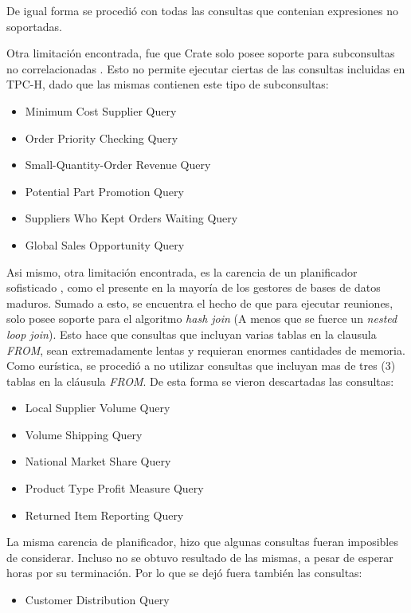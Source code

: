 \documentclass[11pt, twocolumns]{article}
\begin{document}
\begin{multicols}{2}
\begin{verbatim}
\end{verbatim}
De igual forma se procedió con todas las consultas que contenian expresiones no soportadas.
\par
Otra limitación encontrada, fue que Crate solo posee soporte para subconsultas no correlacionadas \cite{crate}. Esto no permite ejecutar ciertas de las consultas incluidas en TPC-H, dado que las mismas contienen este tipo de subconsultas:
\begin{itemize}
  \item [2.] Minimum Cost Supplier Query
  \item [4.] Order Priority Checking Query
  \item [17.] Small-Quantity-Order Revenue Query
  \item [20.] Potential Part Promotion Query
  \item [21.] Suppliers Who Kept Orders Waiting Query
  \item [22.] Global Sales Opportunity Query
\end{itemize}
Asi mismo, otra limitación encontrada, es la carencia de un planificador sofisticado \cite{crate}, como el presente en la mayoría de los gestores de bases de datos maduros. Sumado a esto, se encuentra el hecho de que para ejecutar reuniones, solo posee soporte para el algoritmo \textit{hash join} (A menos que se fuerce un \textit{nested loop join}). Esto hace que consultas que incluyan varias tablas en la clausula \textit{FROM}, sean extremadamente lentas y requieran enormes cantidades de memoria. Como eurística, se procedió a no utilizar consultas que incluyan mas de tres (3) tablas en la cláusula \textit{FROM}. De esta forma se vieron descartadas las consultas:
\begin{itemize}
  \item [5.] Local Supplier Volume Query
  \item [7.] Volume Shipping Query
  \item [8.] National Market Share Query
  \item [9.] Product Type Profit Measure Query
  \item [10.] Returned Item Reporting Query
\end{itemize}
La misma carencia de planificador, hizo que algunas consultas fueran imposibles de considerar. Incluso no se obtuvo resultado de las mismas, a pesar de esperar horas por su terminación. Por lo que se dejó fuera también las consultas:
\begin{itemize}
  \item [13.] Customer Distribution Query

\end{itemize}
\end{multicols}
\end{document}
